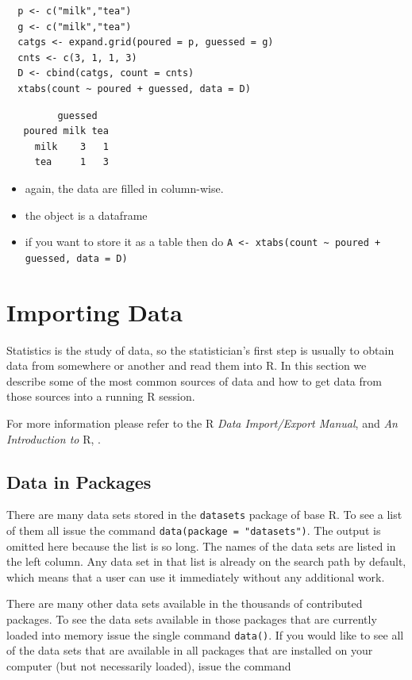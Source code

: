 \documentclass[captions=tableheading]{scrbook}
\begin{document}
\begin{verbatim}
  p <- c("milk","tea")
  g <- c("milk","tea")
  catgs <- expand.grid(poured = p, guessed = g)
  cnts <- c(3, 1, 1, 3)
  D <- cbind(catgs, count = cnts)
  xtabs(count ~ poured + guessed, data = D)
\end{verbatim}

\begin{verbatim}
         guessed
   poured milk tea
     milk    3   1
     tea     1   3
\end{verbatim}

\begin{itemize}
\item again, the data are filled in column-wise.
\item the object is a dataframe
\item if you want to store it as a table then do \texttt{A <- xtabs(count \textasciitilde{} poured + guessed, data = D)}
\end{itemize}
\section{Importing Data \label{sec:Importing-A-Data}}
\label{sec-20-2}


Statistics is the study of data, so the statistician's first step is usually to obtain data from somewhere or another and read them into \textsf{R}. In this section we describe some of the most common sources of data and how to get data from those sources into a running \textsf{R} session.

For more information please refer to the \textsf{R} \emph{Data Import/Export Manual}, \cite{rstatenv} and \emph{An Introduction to} \textsf{R}, \cite{Venables2010}.
\subsection{Data in Packages}
\label{sec-20-2-1}


There are many data sets stored in the \texttt{datasets} package of base \textsf{R}. To see a list of them all issue the command \texttt{data(package = "datasets")}. The output is omitted here because the list is so long. The names of the data sets are listed in the left column. Any data set in that list is already on the search path by default, which means that a user can use it immediately without any additional work. 

There are many other data sets available in the thousands of contributed packages. To see the data sets available in those packages that are currently loaded into memory issue the single command \texttt{data()}. If you would like to see all of the data sets that are available in all packages that are installed on your computer (but not necessarily loaded), issue the command 
\end{document}
